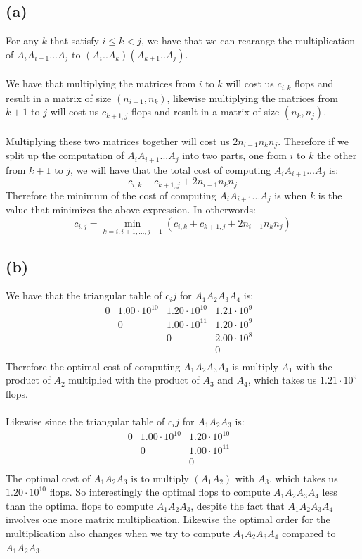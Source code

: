 \subsection*{(a)}
For any $k$ that satisfy $i\leq k < j$, we have that we can rearange the multiplication of $A_iA_{i+1}...A_{j}$ to $(A_i..A_k)(A_{k+1}..A_j)$.\\\\
We have that multiplying the matrices from $i$ to $k$ will cost us $c_{i,k}$ flops and result in a
matrix of size $(n_{i-1},n_k)$, likewise multiplying the matrices from $k+1$ to $j$ will cost us $c_{k+1,j}$ flops and result in a matrix of size $(n_{k},n_j)$.\\\\
Multiplying these two matrices together will cost us $2n_{i-1}n_kn_j$. Therefore if we split up the computation of 
$A_iA_{i+1}...A_{j}$ into two parts, one from $i$ to $k$ the other from $k+1$ to $j$, we will have that the total cost of computing $A_iA_{i+1}...A_{j}$ is:
$$c_{i,k}+c_{k+1,j}+2n_{i-1}n_kn_j$$
Therefore the minimum of the cost of computing $A_iA_{i+1}...A_{j}$ is when $k$ is the value that minimizes the above expression. In otherwords:
$$c_{i,j}=\min_{k=i,i+1,...,j-1}(c_{i,k}+c_{k+1,j}+2n_{i-1}n_kn_j)$$
\subsection*{(b)}
We have that the triangular table of $c_ij$ for $A_1A_2A_3A_4$ is:
$$\begin{matrix}
    0&1.00\cdot 10^{10}&1.20\cdot 10^{10}&1.21\cdot 10^{9}&\\
    & 0&1.00\cdot 10^{11}&1.20\cdot 10^{9}&\\
    & & 0&2.00\cdot 10^{8}&\\
    & & & 0&\\
    \end{matrix}$$
Therefore the optimal cost of computing $A_1A_2A_3A_4$ 
is multiply $A_1$ with the product of $A_2$ multiplied with the product of $A_3$ and $A_4$, 
which takes us $\boxed{1.21\cdot 10^9}$ flops.
\\\\
Likewise since the triangular table of $c_ij$ for $A_1A_2A_3$ is:
$$\begin{matrix}
    0&1.00\cdot 10^{10}&1.20\cdot 10^{10}&\\
    & 0&1.00\cdot 10^{11}&\\
    & & 0&\\
    \end{matrix}$$
The optimal cost of $A_1A_2A_3$ is to multiply $(A_1A_2)$ with $A_3$, 
which takes us $1.20\cdot 10^{10}$ flops. So interestingly the optimal flops
to compute $A_1A_2A_3A_4$ less than the optimal flops to compute $A_1A_2A_3$, 
despite the fact that $A_1A_2A_3A_4$ involves one more matrix multiplication. Likewise the
optimal order for the multiplication also changes when we try to compute $A_1A_2A_3A_4$ compared to $A_1A_2A_3$.





